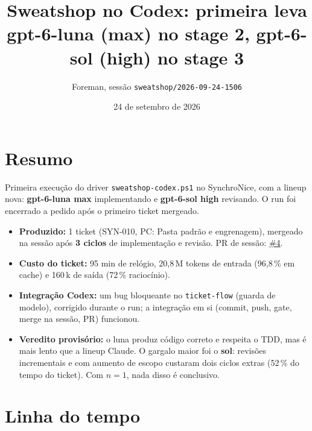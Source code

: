\documentclass[11pt,a4paper]{article}
\title{Sweatshop no Codex: primeira leva\\\large gpt-6-luna (max) no stage 2, gpt-6-sol (high) no stage 3}
\author{Foreman, sessão \texttt{sweatshop/2026-09-24-1506}}
\date{24 de setembro de 2026}
\begin{document}
\maketitle

\section*{Resumo}

Primeira execução do driver \texttt{sweatshop-codex.ps1} no SynchroNice, com a
lineup nova: \textbf{gpt-6-luna max} implementando e \textbf{gpt-6-sol high}
revisando. O run foi encerrado a pedido após o primeiro ticket mergeado.

\begin{itemize}
  \item \textbf{Produzido:} 1 ticket (SYN-010, PC: Pasta padrão e engrenagem),
        mergeado na sessão após \textbf{3 ciclos} de implementação e revisão.
        PR de sessão: \href{https://github.com/Laginho/SynchroNice/pull/4}{\#4}.
  \item \textbf{Custo do ticket:} 95 min de relógio, 20,8\,M tokens de entrada
        (96,8\,\% em cache) e 160\,k de saída (72\,\% raciocínio).
  \item \textbf{Integração Codex:} um bug bloqueante no \texttt{ticket-flow}
        (guarda de modelo), corrigido durante o run; a integração em si
        (commit, push, gate, merge na sessão, PR) funcionou.
  \item \textbf{Veredito provisório:} o luna produz código correto e respeita o
        TDD, mas é mais lento que a lineup Claude. O gargalo maior foi o
        \textbf{sol}: revisões incrementais e com aumento de escopo custaram dois
        ciclos extras (52\,\% do tempo do ticket). Com $n=1$, nada disso é
        conclusivo.
\end{itemize}

\section{Linha do tempo}
\end{document}
